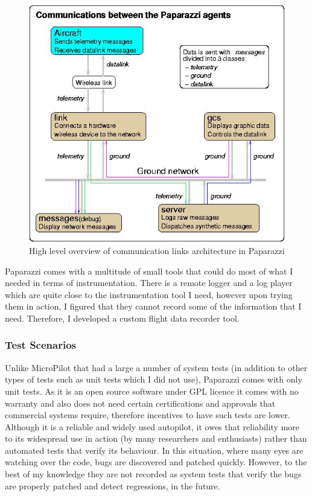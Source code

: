 \begin{figure}
    \centering
    \includegraphics[width=\columnwidth]{pprz_tester_files/Pprz_communication_agents.jpg}
    \caption{High level overview of communication links architecture in Paparazzi \cite{hattenberger2014using}}
    \label{fig:paparazzi_comm_agents}
\end{figure}

Paparazzi comes with a multitude of small tools that could do most of what I needed in terms of instrumentation. There is a remote logger and a log player which are quite close to the instrumentation tool I need, however upon trying them in action, I figured that they cannot record some of the information that I need. Therefore, I developed a custom flight data recorder tool. 

\subsubsection{Test Scenarios}
Unlike MicroPilot that had a large a number of system tests (in addition to other types of tests such as unit tests which I did not use), Paparazzi comes with only unit tests. As it is an open source software under GPL licence it comes with no warranty and also does not need certain certifications and approvals that commercial systems require, therefore incentives to have such tests are lower. 
Although it is a reliable and widely used autopilot, it owes that reliability more to its widespread use in action (by many researchers and enthusiasts) rather than automated tests that verify its behaviour.
In this situation, where many eyes are watching over the code, bugs are discovered and patched quickly. However, to the best of my knowledge they are not recorded as system tests that verify the bugs are properly patched and detect regressions, in the future.

